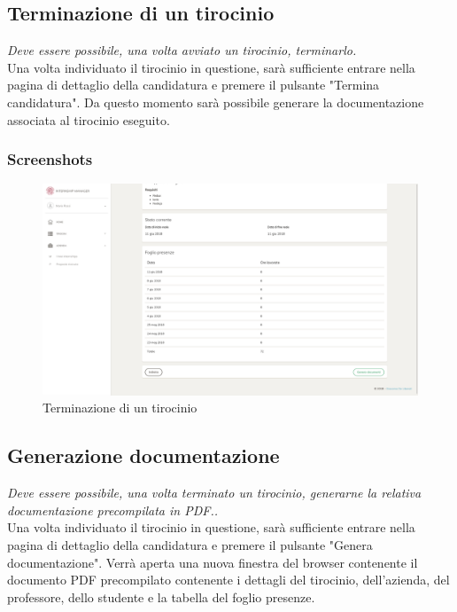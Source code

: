 \pagebreak
\subsection{Terminazione di un tirocinio}\label{sec:terminazione-di-un-tirocinio}

\textit{Deve essere possibile, una volta avviato un tirocinio, terminarlo.} \\

\noindent
Una volta individuato il tirocinio in questione, sarà sufficiente entrare nella pagina di dettaglio della candidatura e premere il pulsante "Termina candidatura". Da questo momento sarà possibile generare la documentazione associata al tirocinio eseguito.

\subsubsection{Screenshots}
\begin{figure}[H]
	\centering
	\includegraphics[width=1\textwidth]{Chapter3/Figs/screenshots/internshipended}     
	\caption[Screenshot: terminazione di un tirocinio]{Terminazione di un tirocinio}
	\label{fig:screenshot:9}
\end{figure}

\pagebreak
\subsection{Generazione documentazione}\label{sec:generazione-documentazione}
\textit{Deve essere possibile, una volta terminato un tirocinio, generarne la relativa documentazione precompilata in PDF..} \\

\noindent
Una volta individuato il tirocinio in questione, sarà sufficiente entrare nella pagina di dettaglio della candidatura e premere il pulsante "Genera documentazione". Verrà aperta una nuova finestra del browser contenente il documento PDF precompilato contenente i dettagli del tirocinio, dell'azienda, del professore, dello studente e la tabella del foglio presenze.

